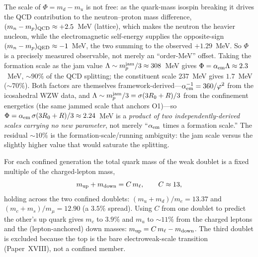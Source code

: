 \begin{remark}
\label{P20:rem:gen1_np}
The scale of $\Phi=m_d-m_u$ is not free: as the quark-mass isospin breaking it
drives the QCD contribution to the neutron--proton mass difference,
$(m_n-m_p)_{\rm QCD}\approx+2.5$~MeV (lattice), which makes the neutron the heavier
nucleon, while the electromagnetic self-energy supplies the opposite-sign
$(m_n-m_p)_{\rm QED}\approx-1$~MeV, the two summing to the observed $+1.29$~MeV. So
$\Phi$ is a precisely measured observable, not merely an ``order-MeV'' offset. Taking
the formation scale as the jam value $\Lambda\sim m_p^{\rm jam}/3\approx308$~MeV gives
$\Phi=\alpha_{\mathrm{em}}\Lambda\approx2.3$~MeV, $\sim90\%$ of the QCD splitting; the constituent
scale $237$~MeV gives $1.7$~MeV ($\sim70\%$). Both factors are themselves
framework-derived---$\alpha_{\mathrm{em}}^{-1}=360/\varphi^2$ from the icosahedral WZW data, and
$\Lambda\sim m_p^{\rm jam}/3=\sigma(3R_0+R)/3$ from the confinement energetics (the same
jammed scale that anchors O1)---so $\Phi=\alpha_{\mathrm{em}}\,\sigma(3R_0+R)/3\approx2.24$~MeV is a
\emph{product of two independently-derived scales carrying no new parameter}, not merely
``$\alpha_{\mathrm{em}}$ times a formation scale.'' The residual $\sim10\%$ is the
formation-scale/running ambiguity: the jam scale versus the slightly higher value that
would saturate the splitting.
\end{remark}

\begin{conjecture}
\label{P20:conj:sumrule}
For each confined generation the total quark mass of the weak doublet is
a fixed multiple of the charged-lepton mass,
\begin{equation}
  m_{\rm up}+m_{\rm down}=C\,m_\ell,\qquad C\approx13,
  \label{P20:eq:sumrule}
\end{equation}
holding across the two confined doublets:
$(m_u+m_d)/m_e=13.37$ and $(m_c+m_s)/m_\mu=12.90$ (a $3.5\%$ spread).
Using $C$ from one doublet to predict the other's up quark gives $m_c$
to $3.9\%$ and $m_u$ to $\sim11\%$ from the charged leptons and the
(lepton-anchored) down masses: $m_{\rm up}=C\,m_\ell-m_{\rm down}$. The
third doublet is excluded because the top is the bare electroweak-scale
transition (Paper~XVIII), not a confined member.
\end{conjecture}

